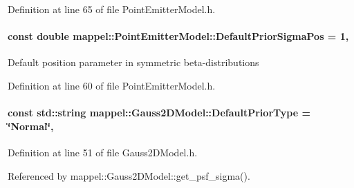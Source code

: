 Definition at line 65 of file Point\+Emitter\+Model.\+h.

\paragraph[{\texorpdfstring{Default\+Prior\+Sigma\+Pos}{DefaultPriorSigmaPos}}]{\setlength{\rightskip}{0pt plus 5cm}const double mappel\+::\+Point\+Emitter\+Model\+::\+Default\+Prior\+Sigma\+Pos = 1\hspace{0.3cm}{\ttfamily [static]}, {\ttfamily [inherited]}}\hypertarget{classmappel_1_1PointEmitterModel_a38b73a91eaae7b5fd0977b88ea844280}{}\label{classmappel_1_1PointEmitterModel_a38b73a91eaae7b5fd0977b88ea844280}
Default position parameter in symmetric beta-\/distributions 

Definition at line 60 of file Point\+Emitter\+Model.\+h.

\paragraph[{\texorpdfstring{Default\+Prior\+Type}{DefaultPriorType}}]{\setlength{\rightskip}{0pt plus 5cm}const std\+::string mappel\+::\+Gauss2\+D\+Model\+::\+Default\+Prior\+Type = \char`\"{}Normal\char`\"{}\hspace{0.3cm}{\ttfamily [static]}, {\ttfamily [inherited]}}\hypertarget{classmappel_1_1Gauss2DModel_af4b934d290782da4f5f7e8e7e5090a94}{}\label{classmappel_1_1Gauss2DModel_af4b934d290782da4f5f7e8e7e5090a94}


Definition at line 51 of file Gauss2\+D\+Model.\+h.



Referenced by mappel\+::\+Gauss2\+D\+Model\+::get\+\_\+psf\+\_\+sigma().

